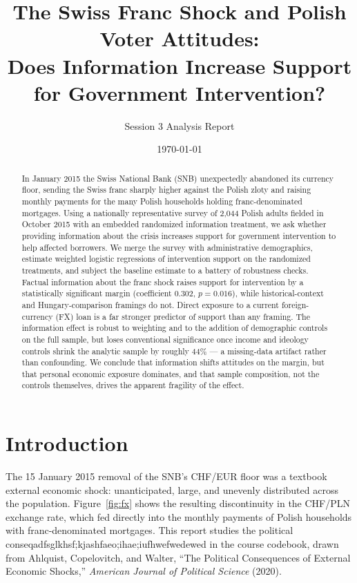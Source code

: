 \documentclass[11pt]{article}
\title{The Swiss Franc Shock and Polish Voter Attitudes:\\
Does Information Increase Support for Government Intervention?}
\author{Session 3 Analysis Report}
\date{\today}
\begin{document}
\maketitle

\begin{abstract}
\noindent
In January 2015 the Swiss National Bank (SNB) unexpectedly abandoned its
currency floor, sending the Swiss franc sharply higher against the Polish zloty
and raising monthly payments for the many Polish households holding
franc-denominated mortgages. Using a nationally representative survey of 2{,}044
Polish adults fielded in October 2015 with an embedded randomized information
treatment, we ask whether providing information about the crisis increases
support for government intervention to help affected borrowers. We merge the
survey with administrative demographics, estimate weighted logistic regressions
of intervention support on the randomized treatments, and subject the baseline
estimate to a battery of robustness checks. Factual information about the franc
shock raises support for intervention by a statistically significant margin
(coefficient $0.302$, $p=0.016$), while historical-context and Hungary-comparison
framings do not. Direct exposure to a current foreign-currency (FX) loan is a far
stronger predictor of support than any framing. The information effect is robust
to weighting and to the addition of demographic controls on the full sample, but
loses conventional significance once income and ideology controls shrink the
analytic sample by roughly 44\% --- a missing-data artifact rather than
confounding. We conclude that information shifts attitudes on the margin, but
that personal economic exposure dominates, and that sample composition, not the
controls themselves, drives the apparent fragility of the effect.
\end{abstract}

\section{Introduction}

The 15 January 2015 removal of the SNB's CHF/EUR floor was a textbook external
economic shock: unanticipated, large, and unevenly distributed across the
population. Figure~\ref{fig:fx} shows the resulting discontinuity in the
CHF/PLN exchange rate, which fed directly into the monthly payments of Polish
households with franc-denominated mortgages. This report studies the political
conseqadfsglkhsf;kjashfaeo;ihae;iufhwefwedewed in the course codebook,
drawn from Ahlquist, Copelovitch, and Walter, ``The Political Consequences of
External Economic Shocks,'' \textit{American Journal of Political Science}
(2020).
\end{document}
